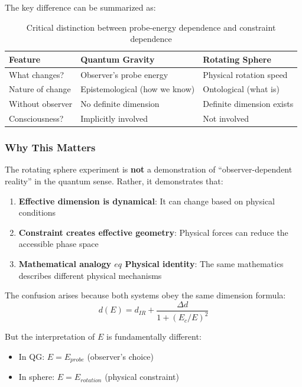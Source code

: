 \documentclass[UTF8]{ctex}\n\documentclass[12pt,a4paper]{article}
\begin{document}
The key difference can be summarized as:

\begin{table}[h]
\centering
\begin{tabular}{p{3cm}p{5cm}p{5cm}}
\toprule
\textbf{Feature} & \textbf{Quantum Gravity} & \textbf{Rotating Sphere} \\
\midrule
What changes? & Observer's probe energy & Physical rotation speed \\
Nature of change & Epistemological (how we know) & Ontological (what is) \\
Without observer & No definite dimension & Definite dimension exists \\
Consciousness? & Implicitly involved & Not involved \\
\bottomrule
\end{tabular}
\caption{Critical distinction between probe-energy dependence and constraint dependence}
\end{table}

\subsubsection{Why This Matters}

The rotating sphere experiment is \textbf{not} a demonstration of ``observer-dependent reality'' in the quantum sense. Rather, it demonstrates that:

\begin{enumerate}
    \item \textbf{Effective dimension is dynamical}: It can change based on physical conditions
    \item \textbf{Constraint creates effective geometry}: Physical forces can reduce the accessible phase space
    \item \textbf{Mathematical analogy $
eq$ Physical identity}: The same mathematics describes different physical mechanisms
\end{enumerate}

The confusion arises because both systems obey the same dimension formula:
\begin{equation}
    d(E) = d_{IR} + \frac{\Delta d}{1+(E_c/E)^2}
\end{equation}

But the interpretation of $E$ is fundamentally different:
\begin{itemize}
    \item In QG: $E = E_{probe}$ (observer's choice)
    \item In sphere: $E = E_{rotation}$ (physical constraint)
\end{itemize}
\end{document}
